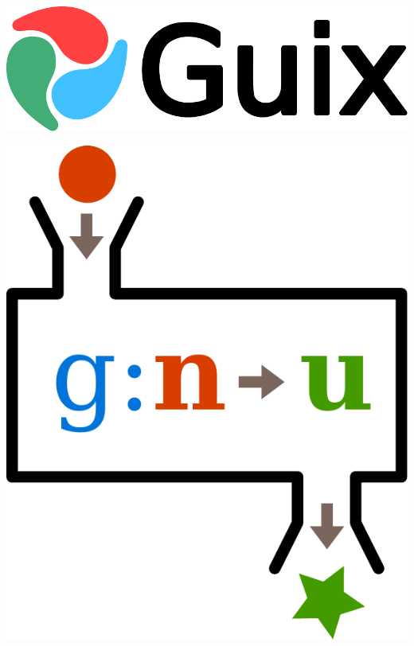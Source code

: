 \documentclass{beamer}
\begin{document}
\begin{frame}[plain]
  \includegraphics[width=\textwidth]{images/guix-logo}
\end{frame}

\begin{frame}[plain]
  \begin{center}
    \includegraphics[height=0.6\textheight]{images/function}
  \end{center}
\end{frame}
\end{document}
